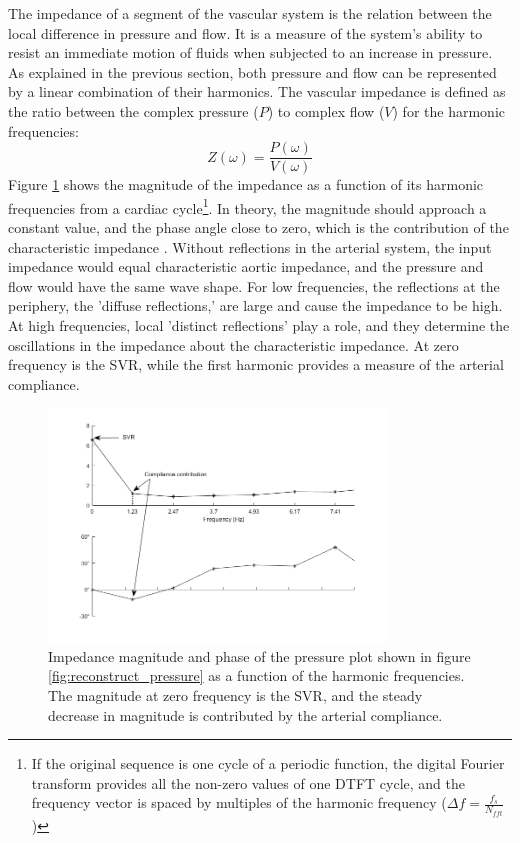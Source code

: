 The impedance of a segment of the vascular system is the relation between the local difference in pressure and flow. It is a measure of the system's ability to resist an immediate motion of fluids when subjected to an increase in pressure. As explained in the previous section, both pressure and flow can be represented by a linear combination of their harmonics. The vascular impedance is defined as the ratio between the complex pressure ($P$) to complex flow ($V$) for the harmonic frequencies:
\begin{equation}
    Z(\omega) = \frac{P(\omega)}{V(\omega)} 
    \label{eq:impedance}
\end{equation}
 Figure \ref{fig:impedance} shows the magnitude of the impedance as a function of its harmonic frequencies from a cardiac cycle\footnote{If the original sequence is one cycle of a periodic function, the digital Fourier transform provides all the non-zero values of one DTFT cycle, and the frequency vector is spaced by multiples of the harmonic frequency ($\Delta f=\frac{f_s}{N_{fft}}$)}. In theory, the magnitude should approach a constant value, and the phase angle close to zero, which is the contribution of the characteristic impedance \cite{RN15}. Without reflections in the arterial system, the input impedance would equal characteristic aortic impedance, and the pressure and flow would have the same wave shape. For low frequencies, the reflections at the periphery, the 'diffuse reflections,' are large and cause the impedance to be high. At high frequencies, local 'distinct reflections' play a role, and they determine the oscillations in the impedance about the characteristic impedance. At zero frequency is the SVR, while the first harmonic provides a measure of the arterial compliance.

\begin{figure}[t!]
    \centering
    \includegraphics[width=0.8\textwidth]{fig/theory/impedance.png}
    \caption{Impedance magnitude and phase of the pressure plot shown in figure \ref{fig:reconstruct_pressure} as a function of the harmonic frequencies. The magnitude at zero frequency is the SVR, and the steady decrease in magnitude is contributed by the arterial compliance.}
    \label{fig:impedance}
\end{figure}{}

